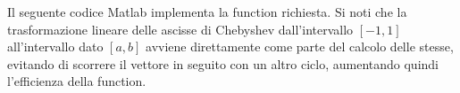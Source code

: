 \begin{center}
\footnotesize\noindent{}\end{center}

\noindent Il seguente codice Matlab implementa la function richiesta. Si noti che la trasformazione lineare delle ascisse di Chebyshev dall'intervallo \([-1, 1]\) all'intervallo dato \([a, b]\) avviene direttamente come parte del calcolo delle stesse, evitando di scorrere il vettore in seguito con un altro ciclo, aumentando quindi l'efficienza della function. \\


